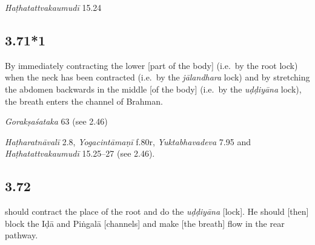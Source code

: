\begin{ekdosis}
\begin{testimonia}[hp03_071]
\emph{Haṭhatattvakaumudī} 15.24
\begin{versinnote}
\end{versinnote}

\end{testimonia}



\subsection*{3.71*1}
\begin{translation}[hp03_071_1]
By immediately contracting the lower [part of the body] (i.e.~by the root lock) when the neck has been contracted (i.e.~by the \emph{jālandhara} lock) and by stretching the abdomen backwards in the middle [of the body] (i.e.~by the \emph{uḍḍiyāna} lock), the breath enters the channel of Brahman.
\end{translation}

\begin{sources}[hp03_071_1]
\emph{Gorakṣaśataka} 63 (see 2.46)
\end{sources}

\begin{testimonia}[hp03_071_1]
\emph{Haṭharatnāvalī} 2.8, \emph{Yogacintāmaṇī} f.80r, \emph{Yuktabhavadeva} 7.95 and \emph{Haṭhatattvakaumudī} 15.25–27 (see 2.46).

\end{testimonia}



\subsection*{3.72}
\begin{translation} should contract the place of the root  and do the \emph{uḍḍiyāna} [lock]. He should [then] block the Iḍā and Piṅgalā [channels] and make [the breath] flow in the rear pathway.
\end{translation}


\end{ekdosis}
